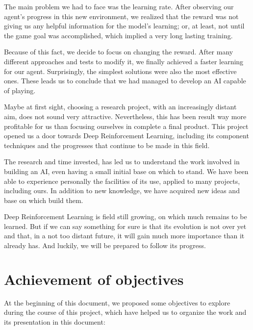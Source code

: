 The main problem we had to face was the learning rate. After observing our agent's progress in this new environment, we realized that the reward was not giving us any helpful information for the model's learning; or, at least, not until the game goal was accomplished, which implied a very long lasting training.

Because of this fact, we decide to focus on changing the reward. After many different approaches and tests to modify it, we finally achieved a faster learning for our agent. Surprisingly, the simplest solutions were also the most effective ones. These leads us to conclude that we had managed to develop an AI capable of playing.

Maybe at first sight, choosing a research project, with an increasingly distant aim, does not sound very attractive. Nevertheless, this has been result way more profitable for us than focusing ourselves in complete a final product. This project opened us a door towards Deep Reinforcement Learning, including its component techniques and the progresses that continue to be made in this field.  

The research and time invested, has led us to understand the work involved in building an AI, even having a small initial base on which to stand. We have been able to experience personally the facilities of its use, applied to many projects, including ours. In addition to new knowledge, we have acquired new ideas and base on which build them.

Deep Reinforcement Learning is field still growing, on which much remains to be learned. But if we can say something for sure is that its evolution is not over yet and that, in a not too distant future, it will gain much more importance than it already has. And luckily, we will be prepared to follow its progress.

\section{Achievement of objectives}

At the beginning of this document, we proposed some objectives to explore during the course of this project, which have helped us to organize the work and its presentation in this document:

